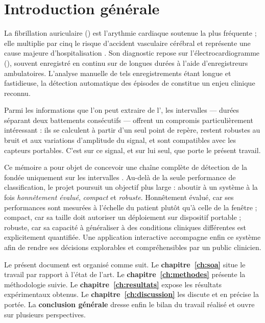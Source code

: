 \chapter*{Introduction générale}
\label{ch:intro}

La fibrillation auriculaire (\FA{}) est l'arythmie cardiaque soutenue la plus fréquente ; elle multiplie par cinq le risque d'accident vasculaire cérébral et représente une cause majeure d'hospitalisation \cite{hindricks2021guidelines}. Son diagnostic repose sur l'électrocardiogramme (\ECG{}), souvent enregistré en continu sur de longues durées à l'aide d'enregistreurs ambulatoires. L'analyse manuelle de tels enregistrements étant longue et fastidieuse, la détection automatique des épisodes de \FA{} constitue un enjeu clinique reconnu.

Parmi les informations que l'on peut extraire de l'\ECG{}, les intervalles \RR{} — durées séparant deux battements consécutifs — offrent un compromis particulièrement intéressant : ils se calculent à partir d'un seul point de repère, restent robustes au bruit et aux variations d'amplitude du signal, et sont compatibles avec les capteurs portables. C'est sur ce signal, et sur lui seul, que porte le présent travail.

Ce mémoire a pour objet de concevoir une chaîne complète de détection de la \FA{} fondée uniquement sur les intervalles \RR{}. Au-delà de la seule performance de classification, le projet poursuit un objectif plus large : aboutir à un système à la fois \emph{honnêtement évalué}, \emph{compact} et \emph{robuste}. Honnêtement évalué, car ses performances sont mesurées à l'échelle du patient plutôt qu'à celle de la fenêtre ; compact, car sa taille doit autoriser un déploiement sur dispositif portable ; robuste, car sa capacité à généraliser à des conditions cliniques différentes est explicitement quantifiée. Une application interactive accompagne enfin ce système afin de rendre ses décisions explorables et compréhensibles par un public clinicien.

Le présent document est organisé comme suit. Le \textbf{chapitre~\ref{ch:soa}} situe le travail par rapport à l'état de l'art. Le \textbf{chapitre~\ref{ch:methodes}} présente la méthodologie suivie. Le \textbf{chapitre~\ref{ch:resultats}} expose les résultats expérimentaux obtenus. Le \textbf{chapitre~\ref{ch:discussion}} les discute et en précise la portée. La \textbf{conclusion générale} dresse enfin le bilan du travail réalisé et ouvre sur plusieurs perspectives.
